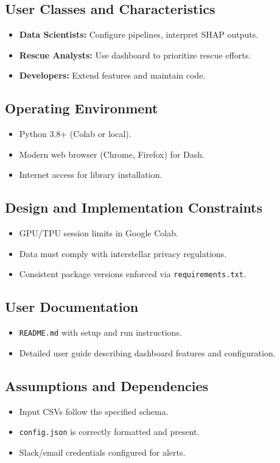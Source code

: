 \documentclass[15pt]{article}
\begin{document}
\subsection{User Classes and Characteristics}
\begin{itemize}
  \item \textbf{Data Scientists:} Configure pipelines, interpret SHAP outputs.
  \item \textbf{Rescue Analysts:} Use dashboard to prioritize rescue efforts.
  \item \textbf{Developers:} Extend features and maintain code.
\end{itemize}

\subsection{Operating Environment}
\begin{itemize}
  \item Python 3.8+ (Colab or local).
  \item Modern web browser (Chrome, Firefox) for Dash.
  \item Internet access for library installation.
\end{itemize}

\subsection{Design and Implementation Constraints}
\begin{itemize}
  \item GPU/TPU session limits in Google Colab.
  \item Data must comply with interstellar privacy regulations.
  \item Consistent package versions enforced via \texttt{requirements.txt}.
\end{itemize}

\subsection{User Documentation}
\begin{itemize}
  \item \texttt{README.md} with setup and run instructions.
  \item Detailed user guide describing dashboard features and configuration.
\end{itemize}

\subsection{Assumptions and Dependencies}
\begin{itemize}
  \item Input CSVs follow the specified schema.
  \item \texttt{config.json} is correctly formatted and present.
  \item Slack/email credentials configured for alerts.
\end{itemize}
\end{document}
